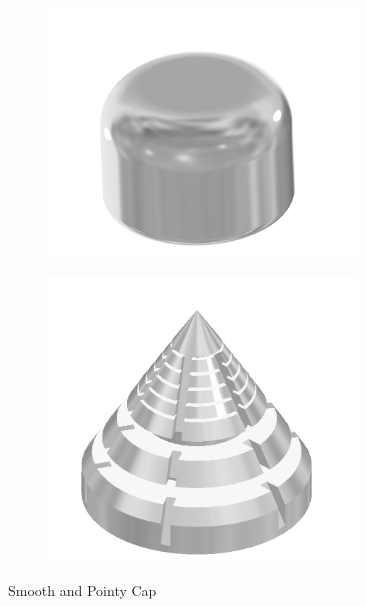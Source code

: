 \begin{figure}[h!]
    \centering
    \label{fig:caps}
    \begin{subfigure}[b]{0.4\textwidth}
        \centering
        \includegraphics[width=0.9\textwidth]{kassandra/resources/mirGehtsSuperDankeSmooth.png}
    \end{subfigure}
    \hfill
    \begin{subfigure}[b]{0.4\textwidth}
        \centering
        \includegraphics[width=0.9\textwidth]{kassandra/resources/mirGehtsSuperDankeEdgy.png}
    \end{subfigure}
    \caption{Smooth and Pointy Cap}
\end{figure}

